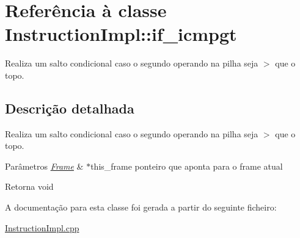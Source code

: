 \hypertarget{class_instruction_impl_1_1if__icmpgt}{}\section{Referência à classe Instruction\+Impl\+:\+:if\+\_\+icmpgt}
\label{class_instruction_impl_1_1if__icmpgt}


Realiza um salto condicional caso o segundo operando na pilha seja $>$ que o topo.  




\subsection{Descrição detalhada}
Realiza um salto condicional caso o segundo operando na pilha seja $>$ que o topo. 


\begin{DoxyParams}{Parâmetros}
{\em \hyperlink{struct_frame}{Frame}} & $\ast$this\+\_\+frame ponteiro que aponta para o frame atual \\
\hline
\end{DoxyParams}
\begin{DoxyReturn}{Retorna}
void 
\end{DoxyReturn}


A documentação para esta classe foi gerada a partir do seguinte ficheiro\+:\begin{DoxyCompactItemize}
\item 
\hyperlink{_instruction_impl_8cpp}{Instruction\+Impl.\+cpp}\end{DoxyCompactItemize}
